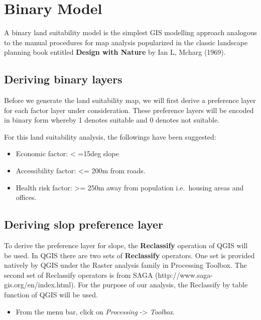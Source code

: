 \documentclass[
  letterpaper,
  DIV=11,
  numbers=noendperiod]{scrreprt}
\providecommand{\tightlist}{%
  \setlength{\itemsep}{0pt}\setlength{\parskip}{0pt}}\usepackage{longtable,booktabs,array}
\begin{document}
\hypertarget{binary-model}{%
\section{Binary Model}\label{binary-model}}

A binary land suitability model is the simplest GIS modelling approach
analogous to the manual procedures for map analysis popularized in the
classic landscape planning book entitled \textbf{Design with Nature} by
Ian L, Mcharg (1969).

\hypertarget{deriving-binary-layers}{%
\subsection{Deriving binary layers}\label{deriving-binary-layers}}

Before we generate the land suitability map, we will first derive a
preference layer for each factor layer under consideration. These
preference layers will be encoded in binary form whereby 1 denotes
suitable and 0 denotes not suitable.

For this land suitability analysis, the followings have been suggested:

\begin{itemize}
\tightlist
\item
  Economic factor: \textless{} =15deg slope
\item
  Accessibility factor: \textless= 200m from roads.
\item
  Health risk factor: \textgreater= 250m away from population
  i.e.~housing areas and offices.
\end{itemize}

\hypertarget{deriving-slop-preference-layer}{%
\subsection{Deriving slop preference
layer}\label{deriving-slop-preference-layer}}

To derive the preference layer for slope, the \textbf{Reclassify}
operation of QGIS will be used. In QGIS there are two sets of
\textbf{Reclassify} operators. One set is provided natively by QGIS
under the Raster analysis family in Processing Toolbox. The second set
of Reclassify operators is from SAGA
(http://www.saga-gis.org/en/index.html). For the purpose of our
analysis, the Reclassify by table function of QGIS will be used.

\begin{itemize}
\tightlist
\item
  From the menu bar, click on \emph{Processing} -\textgreater{}
  \emph{Toolbox}.
\end{itemize}
\end{document}
